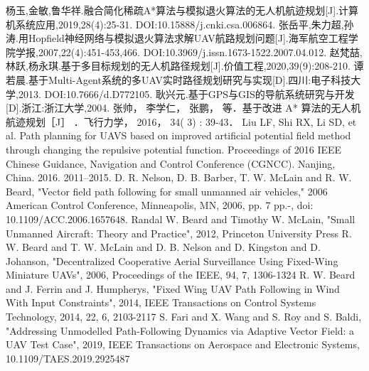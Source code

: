 \documentclass[UTF8,a4paper,10pt,nocolorlinks]{ctexart}
\begin{document}
\renewcommand{\refname}{参考文献}
\begin{thebibliography}{99}
\addtolength{\itemsep}{-2ex} %
杨玉,金敏,鲁华祥.融合简化稀疏A*算法与模拟退火算法的无人机航迹规划[J].计算机系统应用,2019,28(4):25-31. DOI:10.15888/j.cnki.csa.006864.
张岳平,朱力超,孙涛.用Hopfield神经网络与模拟退火算法求解UAV航路规划问题[J].海军航空工程学院学报,2007,22(4):451-453,466. DOI:10.3969/j.issn.1673-1522.2007.04.012.
赵梵喆,林跃,杨永琪.基于多目标规划的无人机路径规划[J].价值工程,2020,39(9):208-210.
谭若晨.基于Multi-Agent系统的多UAV实时路径规划研究与实现[D].四川:电子科技大学,2013. DOI:10.7666/d.D772105.
耿兴元.基于GPS与GIS的导航系统研究与开发[D].浙江:浙江大学,2004.
张帅， 李学仁， 张鹏， 等．基于改进 A* 算法的无人机航迹规划［J］ ．飞行力学， 2016， 34( 3) : 39-43．
Liu LF, Shi RX, Li SD, et al. Path planning for UAVS based
on  improved  artificial  potential  field  method  through
changing  the  repulsive  potential  function.  Proceedings  of
2016  IEEE  Chinese  Guidance,  Navigation  and  Control
Conference  (CGNCC).  Nanjing,  China.  2016.  2011–2015.
D. R. Nelson, D. B. Barber, T. W. McLain and R. W. Beard, "Vector field path following for small unmanned air vehicles," 2006 American Control Conference, Minneapolis, MN, 2006, pp. 7 pp.-, doi: 10.1109/ACC.2006.1657648.
Randal W. Beard and Timothy W. McLain, "Small Unmanned Aircraft: Theory and Practice", 2012, Princeton University Press
R. W. {Beard} and T. W. {McLain} and D. B. {Nelson} and D. {Kingston} and D. {Johanson}, "Decentralized Cooperative Aerial Surveillance Using Fixed-Wing Miniature {UAVs}", 2006, Proceedings of the IEEE, 94, 7, 1306-1324
R. W. {Beard} and J. {Ferrin} and J. {Humpherys}, "Fixed Wing {UAV} Path Following in Wind With Input Constraints", 2014, IEEE Transactions on Control Systems Technology, 2014, 22, 6, 2103-2117
S. {Fari} and X. {Wang} and S. {Roy} and S. {Baldi}, "Addressing Unmodelled Path-Following Dynamics via Adaptive Vector Field: a {UAV} Test Case", 2019, IEEE Transactions on Aerospace and Electronic Systems, 10.1109/TAES.2019.2925487
\end{thebibliography}  
\clearpage
\end{document}
